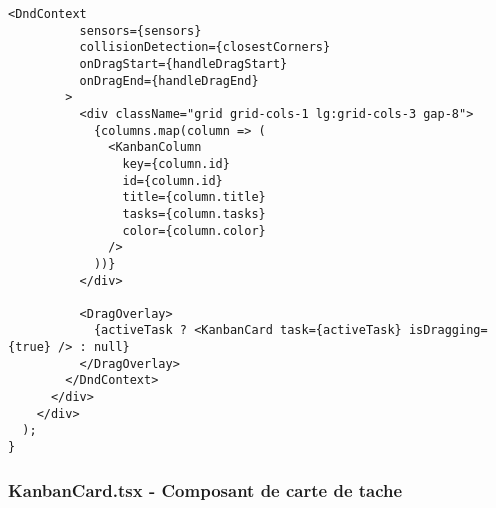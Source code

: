 \documentclass[12pt,a4paper]{article}
\begin{document}
\begin{lstlisting}[caption=Kanban.tsx - Tableau Kanban avec drag-and-drop (Tomas)]
        <DndContext
          sensors={sensors}
          collisionDetection={closestCorners}
          onDragStart={handleDragStart}
          onDragEnd={handleDragEnd}
        >
          <div className="grid grid-cols-1 lg:grid-cols-3 gap-8">
            {columns.map(column => (
              <KanbanColumn
                key={column.id}
                id={column.id}
                title={column.title}
                tasks={column.tasks}
                color={column.color}
              />
            ))}
          </div>

          <DragOverlay>
            {activeTask ? <KanbanCard task={activeTask} isDragging={true} /> : null}
          </DragOverlay>
        </DndContext>
      </div>
    </div>
  );
}
\end{lstlisting}

\subsubsection{KanbanCard.tsx - Composant de carte de tache}
\end{document}
